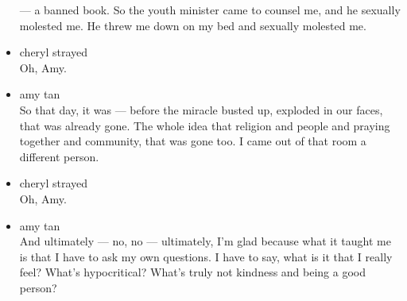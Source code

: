 \begin{itemize}
  --- a banned book. So the youth minister came to counsel me, and he
  sexually molested me. He threw me down on my bed and sexually molested
  me.
\item
  cheryl strayed\\
  Oh, Amy.
\item
  amy tan\\
  So that day, it was --- before the miracle busted up, exploded in our
  faces, that was already gone. The whole idea that religion and people
  and praying together and community, that was gone too. I came out of
  that room a different person.
\item
  cheryl strayed\\
  Oh, Amy.
\item
  amy tan\\
  And ultimately --- no, no --- ultimately, I'm glad because what it
  taught me is that I have to ask my own questions. I have to say, what
  is it that I really feel? What's hypocritical? What's truly not
  kindness and being a good person?


\end{itemize}
